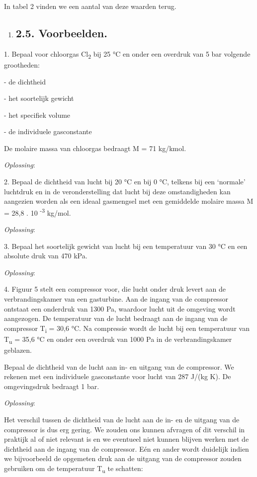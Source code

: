 \documentclass[]{article}
\begin{document}
In tabel 2 vinden we een aantal van deze waarden terug.

\begin{enumerate}
\item
  \subsection{2.5. Voorbeelden.}\label{voorbeelden.-1}
\end{enumerate}

1. Bepaal voor chloorgas Cl\textsubscript{2} bij 25 °C en onder een
overdruk van 5 bar volgende grootheden:

- de dichtheid

- het soortelijk gewicht

- het specifiek volume

- de individuele gasconstante

De molaire massa van chloorgas bedraagt M = 71 kg/kmol.

\emph{Oplossing}:

2. Bepaal de dichtheid van lucht bij 20 °C en bij 0 °C, telkens bij een
`normale' luchtdruk en in de veronderstelling dat lucht bij deze
omstandigheden kan aangezien worden als een ideaal gasmengsel met een
gemiddelde molaire massa M = 28,8 . 10 \textsuperscript{-3} kg/mol.

\emph{Oplossing}:

3. Bepaal het soortelijk gewicht van lucht bij een temperatuur van 30 °C
en een absolute druk van 470 kPa.

\emph{Oplossing}:

4. Figuur 5 stelt een compressor voor, die lucht onder druk levert aan
de verbrandingskamer van een gasturbine. Aan de ingang van de compressor
ontstaat een onderdruk van 1300 Pa, waardoor lucht uit de omgeving wordt
aangezogen. De temperatuur van de lucht bedraagt aan de ingang van de
compressor T\textsubscript{i} = 30,6 °C. Na compressie wordt de lucht
bij een temperatuur van T\textsubscript{u} = 35,6 °C en onder een
overdruk van 1000 Pa in de verbrandingskamer geblazen.

Bepaal de dichtheid van de lucht aan in- en uitgang van de compressor.
We rekenen met een individuele gasconstante voor lucht van 287 J/(kg K).
De omgevingsdruk bedraagt 1 bar.

\emph{Oplossing}:

Het verschil tussen de dichtheid van de lucht aan de in- en de uitgang
van de compressor is dus erg gering. We zouden ons kunnen afvragen of
dit verschil in praktijk al of niet relevant is en we eventueel niet
kunnen blijven werken met de dichtheid aan de ingang van de compressor.
Eén en ander wordt duidelijk indien we bijvoorbeeld de opgemeten druk
aan de uitgang van de compressor zouden gebruiken om de temperatuur
T\textsubscript{u} te schatten:
\end{document}
